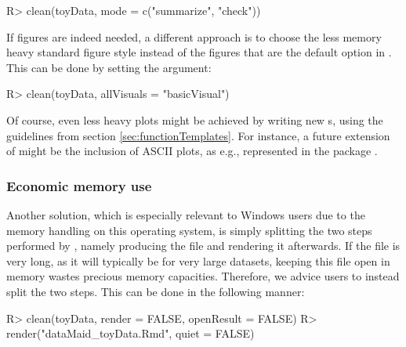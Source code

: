 \documentclass[article,shortnames]{jss}
\newcommand{\hl}[1]{\textcolor{magenta}{#1}}
\begin{document}
\begin{Schunk}
\begin{Sinput}
R> clean(toyData, mode = c("summarize", "check"))
\end{Sinput}
\end{Schunk}

If figures are indeed needed, a different approach is to choose the
less memory heavy standard  figure style instead of the
 figures that are the default option in . This
can be done by setting the  argument:

\begin{Schunk}
\begin{Sinput}
R> clean(toyData, allVisuals = "basicVisual")
\end{Sinput}
\end{Schunk}

Of course, even less heavy plots might be achieved by writing new
s, using the guidelines from section
\ref{sec:functionTemplates}. For instance, a future extension of
 might be the inclusion of ASCII plots, as
e.g., represented in the  package  \citep{txtplot}.


\subsubsection{Economic memory use}
Another solution, which is
especially relevant to Windows users due to %
the memory handling on this operating system,
is simply splitting the two steps performed
by , namely producing the  file and rendering it
afterwards. If the  file is very long, as it will
typically be for very large datasets, keeping this file open in memory
wastes precious memory capacities. Therefore, we advice users to
instead split the two steps. This can be done in the following manner:

\begin{Schunk}
\begin{Sinput}
R> clean(toyData, render = FALSE, openResult = FALSE)
R> render("dataMaid_toyData.Rmd", quiet = FALSE)
\end{Sinput}
\end{Schunk}
\end{document}
